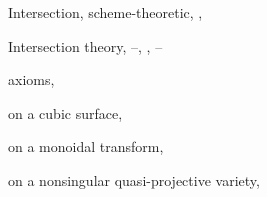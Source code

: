 {{\noindent\hspace*{0.0bp}Intersection, scheme-theoretic, , \par
\noindent\hspace*{0.0bp}Intersection theory, --, , --\par
\noindent\hspace*{7.5bp}axioms, \par
\noindent\hspace*{7.5bp}on a cubic surface, \par
\noindent\hspace*{7.5bp}on a monoidal transform, \par
\noindent\hspace*{7.5bp}on a nonsingular quasi-projective variety,\par
\noindent\hspace*{15.0bp}\par
}
}
